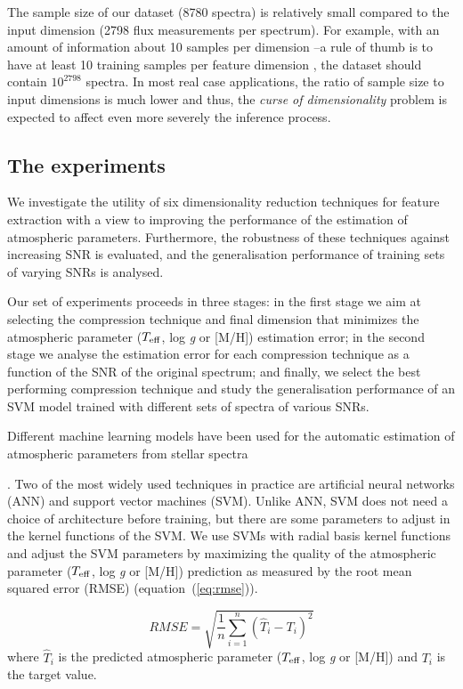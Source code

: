 \documentclass[a4paper,fleqn,usenatbib]{mnras}
\begin{document}
{The sample size of our dataset (8780 spectra) is relatively
small compared to the input dimension (2798 flux measurements
per spectrum). For example, with an amount of information 
about 10 samples per dimension --a rule of thumb is to have at 
least 10 training samples per feature dimension \citep{jain:00}, 
the dataset should contain $10^{2798}$ spectra.
In most real case applications, the ratio of sample size to input 
dimensions is much lower and thus, the \textit{curse of dimensionality} 
problem is expected to affect even more severely the inference process. 


\subsection{The experiments}
\label{sec:modelling}

We investigate the utility of six dimensionality reduction techniques
for feature extraction with a view to improving the performance of the
estimation of atmospheric parameters. Furthermore, the robustness of
these techniques against increasing SNR is evaluated, and the
generalisation performance of training sets of varying SNRs is
analysed.

Our set of experiments proceeds in three stages: in the first
  stage we aim at selecting the compression technique and final
  dimension that minimizes the atmospheric parameter ($T_{\rm eff}$, 
  log \textit{g} or [M/H]) estimation error; in the
  second stage we analyse the estimation error for each compression
  technique as a function of the SNR of the original spectrum; and
  finally, we select the best performing compression technique and
  study the generalisation performance of an SVM model trained with
  different sets of spectra of various SNRs.

Different machine learning models have been used for the
  automatic estimation of atmospheric parameters from stellar
  spectra}. Two of the most widely used techniques in practice are
artificial neural networks (ANN) and support vector machines
(SVM). Unlike ANN, SVM does not need a choice of architecture before
training, but there are some parameters to adjust in the kernel
functions of the SVM. We use SVMs with radial basis kernel
  functions and adjust the SVM parameters by maximizing the quality of
  the  atmospheric parameter ($T_{\rm eff}$, 
  log \textit{g} or [M/H]) prediction as measured 
  by the root mean squared error (RMSE) (equation~(\ref{eq:rmse})).

\begin{equation}
\label{eq:rmse}
RMSE=\sqrt{\frac{1}{n}\sum_{i=1}^{n}\left(\hat{T}_{i}-T_{i}\right)^{2}}
\end{equation}
where $\hat{T}_{i}$ is the predicted atmospheric parameter ($T_{\rm eff}$, 
  log \textit{g} or [M/H]) and $T_{i}$ is the target value. 
  
\end{document}
